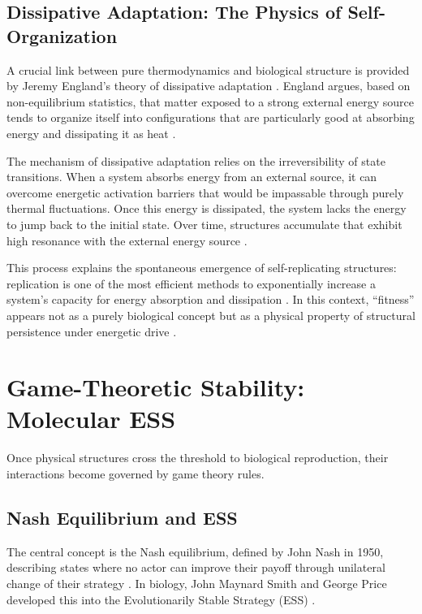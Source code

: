 \documentclass[12pt,a4paper]{article}
\theoremstyle{remark}
\begin{document}
\subsection{Dissipative Adaptation: The Physics of Self-Organization}

A crucial link between pure thermodynamics and biological structure is provided by Jeremy England's theory of dissipative adaptation \citep{EnglandJCP,EnglandNano}. England argues, based on non-equilibrium statistics, that matter exposed to a strong external energy source tends to organize itself into configurations that are particularly good at absorbing energy and dissipating it as heat \citep{EnglandJCP}.

The mechanism of dissipative adaptation relies on the irreversibility of state transitions. When a system absorbs energy from an external source, it can overcome energetic activation barriers that would be impassable through purely thermal fluctuations. Once this energy is dissipated, the system lacks the energy to jump back to the initial state. Over time, structures accumulate that exhibit high resonance with the external energy source \citep{EnglandNano}.

This process explains the spontaneous emergence of self-replicating structures: replication is one of the most efficient methods to exponentially increase a system's capacity for energy absorption and dissipation \citep{EnglandNano}. In this context, ``fitness'' appears not as a purely biological concept but as a physical property of structural persistence under energetic drive \citep{EnglandJCP}.

\section{Game-Theoretic Stability: Molecular ESS}
\label{sec:molecular}

Once physical structures cross the threshold to biological reproduction, their interactions become governed by game theory rules.

\subsection{Nash Equilibrium and ESS}

The central concept is the Nash equilibrium, defined by John Nash in 1950, describing states where no actor can improve their payoff through unilateral change of their strategy \citep{NashPNAS,NashSFI}. In biology, John Maynard Smith and George Price developed this into the Evolutionarily Stable Strategy (ESS) \citep{MaynardSmithPrice1973,MaynardSmith1982}.
\end{document}
